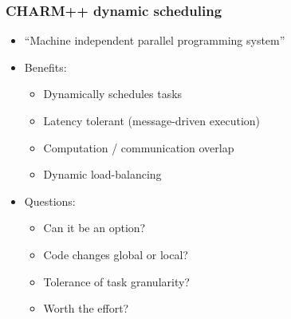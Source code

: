 \begin{frame}[fragile] \frametitle{CHARM++ dynamic scheduling}
\begin{itemize}
\item ``Machine independent parallel programming system''
\item Benefits:
\begin{itemize}
\item Dynamically schedules tasks
\item Latency tolerant (message-driven execution)
\item Computation / communication overlap
\item Dynamic load-balancing
\end{itemize} 
\item Questions:
\begin{itemize}
\item Can it be an option?
\item Code changes global or local?
\item Tolerance of task granularity?
\item Worth the effort?
\end{itemize}
\end{itemize}
\end{frame}
